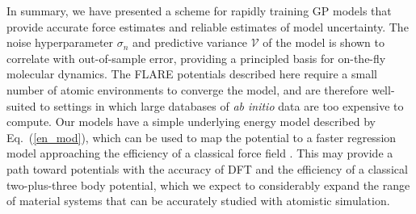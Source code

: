 \documentclass[%
superscriptaddress,
preprint,
linenumbers,
amsmath,amssymb,
aps,
prl,
]{revtex4-1}
\begin{document}
In summary, we have presented a scheme for rapidly training GP models that provide accurate force estimates and reliable estimates of model uncertainty. The noise hyperparameter $\sigma_n$ and predictive variance $\mathcal{V}$ of the model is shown to correlate with out-of-sample error, providing a principled basis for on-the-fly molecular dynamics. The FLARE potentials described here require a small number of atomic environments to converge the model, and are therefore well-suited to settings in which large databases of \textit{ab initio} data are too expensive to compute. Our models have a simple underlying energy model described by Eq.\ (\ref{en_mod}), which can be used to map the potential to a faster regression model approaching the efficiency of a classical force field \cite{glielmo2018efficient}. This may provide a path toward potentials with the accuracy of DFT and the efficiency of a classical two-plus-three body potential, which we expect to considerably expand the range of material systems that can be accurately studied with atomistic simulation.

\end{document}
